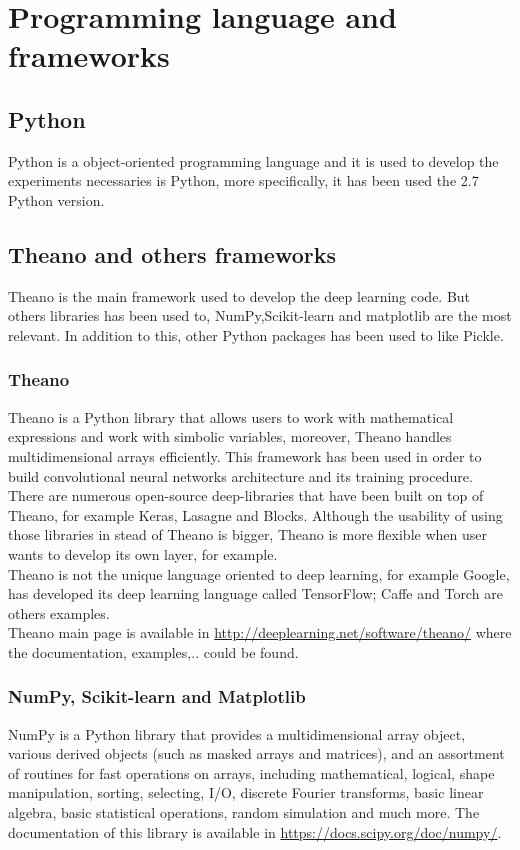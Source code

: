 \section{Programming language and frameworks}

\subsection{Python}
Python is a  object-oriented programming language and it is used to develop the experiments necessaries is Python, more specifically, it has been used the 2.7 Python version.

\subsection{Theano and others frameworks}
Theano is the main framework used to develop the deep learning code. But others libraries has been used to, NumPy,Scikit-learn and matplotlib are the most relevant. In addition to this, other Python packages has been used to like Pickle.

\subsubsection{Theano}
Theano \cite{theano} is a Python library that allows users to work with mathematical expressions and work with simbolic variables, moreover, Theano handles multidimensional arrays efficiently. This framework has been used in order to build convolutional neural networks architecture and its training procedure.\\

There are numerous open-source deep-libraries that have been built on top of Theano, for example Keras, Lasagne and Blocks. Although the usability of using those libraries in stead of Theano is bigger, Theano is more flexible when user wants to develop its own layer, for example.\\

Theano is not the unique language oriented to deep learning, for example Google, has developed its deep learning language called TensorFlow; Caffe and Torch are others examples.\\

Theano main page is available in \url{http://deeplearning.net/software/theano/} where the documentation, examples,.. could be found.\\

\subsubsection{NumPy, Scikit-learn and Matplotlib}
NumPy is a Python library that provides a multidimensional array object, various derived objects (such as masked arrays and matrices), and an assortment of routines for fast operations on arrays, including mathematical, logical, shape manipulation, sorting, selecting, I/O, discrete Fourier transforms, basic linear algebra, basic statistical operations, random simulation and much more. The documentation of this library is available in \url{https://docs.scipy.org/doc/numpy/}.\\

